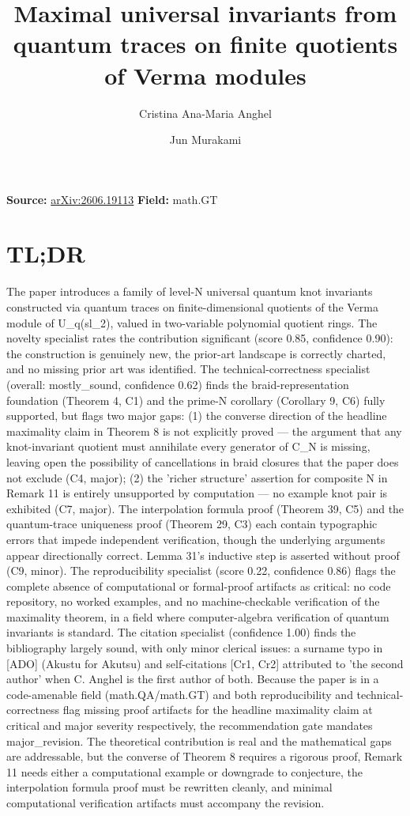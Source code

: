 \documentclass[11pt]{article}
\title{Maximal universal invariants from quantum traces on finite quotients of Verma modules}
\author{Cristina Ana-Maria Anghel \and Jun Murakami}
\date{}
\begin{document}
\maketitle

\noindent\textbf{Source:} \href{https://arxiv.org/abs/2606.19113}{arXiv:2606.19113} \quad \textbf{Field:} math.GT\\

\section*{TL;DR}
The paper introduces a family of level-N universal quantum knot invariants constructed via quantum traces on finite-dimensional quotients of the Verma module of U\_q(sl\_2), valued in two-variable polynomial quotient rings. The novelty specialist rates the contribution significant (score 0.85, confidence 0.90): the construction is genuinely new, the prior-art landscape is correctly charted, and no missing prior art was identified. The technical-correctness specialist (overall: mostly\_sound, confidence 0.62) finds the braid-representation foundation (Theorem 4, C1) and the prime-N corollary (Corollary 9, C6) fully supported, but flags two major gaps: (1) the converse direction of the headline maximality claim in Theorem 8 is not explicitly proved --- the argument that any knot-invariant quotient must annihilate every generator of C\_N is missing, leaving open the possibility of cancellations in braid closures that the paper does not exclude (C4, major); (2) the 'richer structure' assertion for composite N in Remark 11 is entirely unsupported by computation --- no example knot pair is exhibited (C7, major). The interpolation formula proof (Theorem 39, C5) and the quantum-trace uniqueness proof (Theorem 29, C3) each contain typographic errors that impede independent verification, though the underlying arguments appear directionally correct. Lemma 31's inductive step is asserted without proof (C9, minor). The reproducibility specialist (score 0.22, confidence 0.86) flags the complete absence of computational or formal-proof artifacts as critical: no code repository, no worked examples, and no machine-checkable verification of the maximality theorem, in a field where computer-algebra verification of quantum invariants is standard. The citation specialist (confidence 1.00) finds the bibliography largely sound, with only minor clerical issues: a surname typo in [ADO] (Akustu for Akutsu) and self-citations [Cr1, Cr2] attributed to 'the second author' when C. Anghel is the first author of both. Because the paper is in a code-amenable field (math.QA/math.GT) and both reproducibility and technical-correctness flag missing proof artifacts for the headline maximality claim at critical and major severity respectively, the recommendation gate mandates major\_revision. The theoretical contribution is real and the mathematical gaps are addressable, but the converse of Theorem 8 requires a rigorous proof, Remark 11 needs either a computational example or downgrade to conjecture, the interpolation formula proof must be rewritten cleanly, and minimal computational verification artifacts must accompany the revision.
\end{document}
